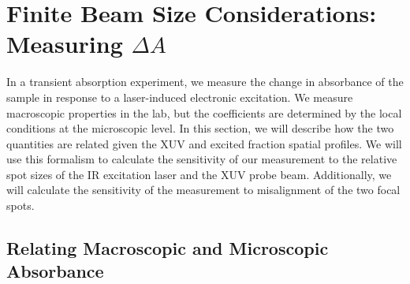 %

\section{Finite Beam Size Considerations: Measuring $\Delta A$}
In a transient absorption experiment, we measure the change in absorbance of the sample in response to a laser-induced electronic excitation. We measure macroscopic properties in the lab, but the coefficients are determined by the local conditions at the microscopic level. In this section, we will describe how the two quantities are related given the XUV and excited fraction spatial profiles. We will use this formalism to calculate the sensitivity of our measurement to the relative spot sizes of the IR excitation laser and the XUV probe beam. Additionally, we will calculate the sensitivity of the measurement to misalignment of the two focal spots.

\subsection{Relating Macroscopic and Microscopic Absorbance}
\label{sec:micro_macro_DeltaA}


